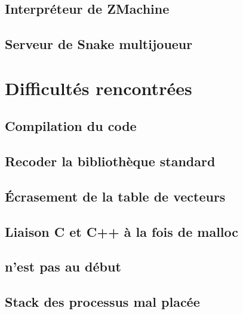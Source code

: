 \documentclass[11pt,a4paper]{article}
\newcommand{\todo}[1]{\colorbox{orange}{\color{blue}{\Large TODO:} #1}}
\begin{document}
\subsection{Interpréteur de ZMachine}
\subsection{Serveur de Snake multijoueur}

\section{Difficultés rencontrées}

\subsection{Compilation du code}\label{ssec:diff:compil}
\todo{}
\subsection{Recoder la bibliothèque standard}\label{ssec:diff:stdlib}
\todo{}
\subsection{Écrasement de la table de vecteurs}\label{ssec:diff:delvect}
\todo{}
\subsection{Liaison C et C++ à la fois de malloc}\label{ssec:diff:linkage}
\todo{}
\subsection{ n'est pas au début}\label{ssec:diff:startup}
\todo{}
\subsection{Stack des processus mal placée}\label{ssec:diff:async_stack}
\todo{}
\end{document}
